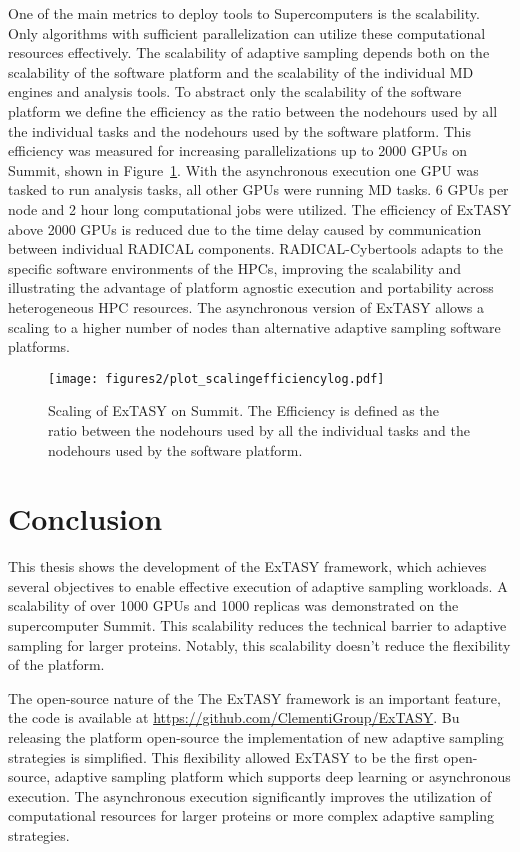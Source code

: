 {One of the main metrics to deploy tools to Supercomputers is the scalability. Only algorithms with sufficient parallelization can utilize these computational resources effectively. The scalability of adaptive sampling depends both on the scalability of the software platform and the scalability of the individual MD engines and analysis tools. To abstract only the scalability of the software platform we define the efficiency as the ratio between the nodehours used by all the individual tasks and the nodehours used by the software platform. 
This efficiency was measured for increasing parallelizations up to 2000 GPUs on Summit, shown in Figure~\ref{fig:scaling}. With the asynchronous execution one GPU was tasked to run analysis tasks, all other GPUs were running MD tasks. 6 GPUs per node and 2 hour long computational jobs were utilized. The efficiency of ExTASY above 2000 GPUs is reduced due to the time delay caused by communication between individual RADICAL components. RADICAL-Cybertools adapts to the specific software environments of the HPCs\cite{turilli2019ac}, improving the scalability and illustrating the advantage of platform agnostic execution and portability across
heterogeneous HPC resources. The asynchronous version of ExTASY allows a scaling to a higher number of nodes than alternative adaptive sampling software platforms.

\begin{figure}[H]
  \centering
  \texttt{[image: figures2/plot\_scalingefficiencylog.pdf]}
  \caption{Scaling of ExTASY on Summit. The Efficiency is defined as the ratio between the nodehours used by all the individual tasks and the nodehours used by the software platform. }
  \label{fig:scaling}
\end{figure}



\section{\label{sec:conclusion}Conclusion}
This thesis shows the development of the ExTASY framework, which achieves several objectives to enable effective execution of adaptive sampling workloads. A scalability of over 1000 GPUs and 1000 replicas was demonstrated on the supercomputer Summit. This scalability reduces the technical barrier to adaptive sampling for larger proteins. Notably, this scalability doesn't reduce the flexibility of the platform.

The open-source nature of the The ExTASY framework is an important feature, the code is available at \href{https://github.com/ClementiGroup/ExTASY}{https://github.com/ClementiGroup/ExTASY}. Bu releasing the platform open-source the implementation of new adaptive sampling strategies is simplified. This flexibility allowed ExTASY to be the first open-source, adaptive sampling platform which supports deep learning or asynchronous execution. The asynchronous execution significantly improves the utilization of computational resources for larger proteins or more complex adaptive sampling strategies.

}

